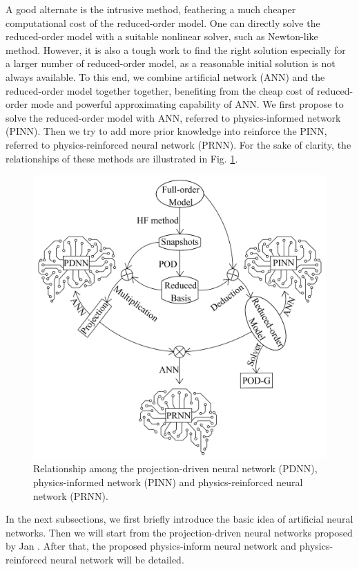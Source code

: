 \documentclass[preprint, 10pt]{elsarticle}
\begin{document}
A good alternate is the intrusive method, feathering a much cheaper computational cost of the reduced-order model. One can directly solve the reduced-order model with a suitable nonlinear solver, such as Newton-like method. However, it is also a tough work to find the right solution especially for a larger number of reduced-order model, as a reasonable initial solution is not always available. To this end, we combine artificial network (ANN) and the reduced-order model together together, benefiting from the cheap cost of reduced-order mode and powerful approximating capability of ANN. We first propose to solve the reduced-order model with ANN, referred to physics-informed network (PINN). Then we try to add more prior knowledge into reinforce the PINN, referred to physics-reinforced neural network (PRNN). For the sake of clarity, the relationships of these methods are illustrated in Fig. \ref{fig_relationship}.
\begin{figure}[!ht]
  \centering
  \includegraphics[width=12cm]{../fig/RelationshipChart.pdf}
\caption{Relationship among the projection-driven neural network (PDNN), physics-informed network (PINN) and physics-reinforced neural network (PRNN).}
\label{fig_relationship}
\end{figure}

In the next subsections, we first briefly introduce the basic idea of artificial neural networks. Then we will start from the projection-driven neural networks proposed by Jan \cite{hesthaven2018non}. After that, the proposed physics-inform neural network and physics-reinforced neural network will be detailed.
\end{document}
